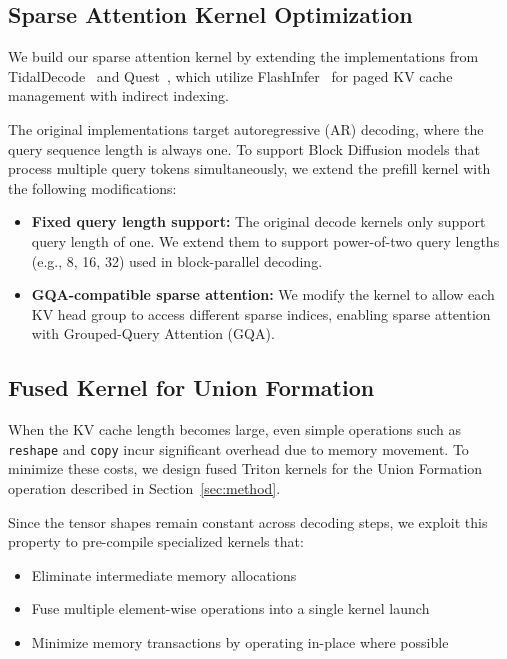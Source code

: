 \subsection{Sparse Attention Kernel Optimization}
\label{appendix:kernel_opt}
We build our sparse attention kernel by extending the implementations 
from TidalDecode~\cite{yang2025tidaldecode} and Quest~\cite{tang2024quest}, 
which utilize FlashInfer~\cite{ye2025flashinfer} for paged KV cache 
management with indirect indexing.

The original implementations target autoregressive (AR) decoding, where the query sequence length is always one. 
To support Block Diffusion models that process multiple query tokens simultaneously, we extend the prefill kernel with the following modifications:
\begin{itemize}
    \item \textbf{Fixed query length support:} The original decode kernels only support query length of one. We extend them to support power-of-two query lengths (e.g., 8, 16, 32) used in block-parallel decoding.
    \item \textbf{GQA-compatible sparse attention:} We modify the kernel to allow each KV head group to access different sparse indices, enabling sparse attention with Grouped-Query Attention (GQA).
\end{itemize}

\subsection{Fused Kernel for Union Formation}
\label{appendix:fused_kernel}

When the KV cache length becomes large, even simple operations such as \texttt{reshape} and \texttt{copy} incur significant overhead due to memory movement. 
To minimize these costs, we design fused Triton kernels for the Union Formation operation described in Section~\ref{sec:method}.

Since the tensor shapes remain constant across decoding steps, we exploit this property to pre-compile specialized kernels that:
\begin{itemize}
    \item Eliminate intermediate memory allocations
    \item Fuse multiple element-wise operations into a single kernel launch
    \item Minimize memory transactions by operating in-place where possible
\end{itemize}

